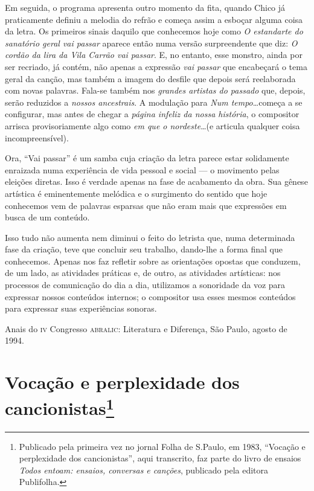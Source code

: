 Em seguida, o programa apresenta outro momento da fita, quando Chico já
praticamente definiu a melodia do refrão e começa assim a esboçar alguma
coisa da letra. Os primeiros sinais daquilo que conhecemos hoje como \textit{O
estandarte do sanatório geral vai passar} aparece então numa versão
surpreendente que diz: \textit{O cordão da lira da Vila Carrão vai passar}.
E, no entanto, esse monstro, ainda por ser recriado, já contém, não
apenas a expressão \textit{vai passar} que encabeçará o tema geral da canção,
mas também a imagem do desfile que depois será reelaborada com novas
palavras. Fala-se também nos \textit{grandes artistas do passado} que,
depois, serão reduzidos a \textit{nossos ancestrais}. A modulação para \textit{Num
tempo}\ldots começa a se configurar, mas antes de chegar a \textit{página
infeliz da nossa história}, o compositor arrisca provisoriamente algo
como \textit{em que o nordeste}\ldots (e articula qualquer coisa
incompreensível).

Ora, ``Vai passar'' é um samba cuja criação da letra parece estar
solidamente enraizada numa experiência de vida pessoal e social
 --- o movimento pelas eleições diretas. Isso é verdade apenas na fase de
acabamento da obra. Sua gênese artística é eminentemente melódica e o
surgimento do sentido que hoje conhecemos vem de palavras esparsas que
não eram mais que expressões em busca de um conteúdo.

Isso tudo não aumenta nem diminui o feito do letrista que, numa determinada fase da criação, teve que concluir seu trabalho, dando-lhe a
forma final que conhecemos. Apenas nos faz refletir sobre as orientações
opostas que conduzem, de um lado, as atividades práticas e, de outro, as
atividades artísticas: nos processos de comunicação do dia a dia,
utilizamos a sonoridade da voz para expressar nossos conteúdos internos;
o compositor usa esses mesmos conteúdos para expressar suas experiências
sonoras.

Anais do \textsc{iv} Congresso \textsc{abralic}: Literatura e Diferença, São Paulo, agosto
de 1994.

\chapter{Vocação e perplexidade dos cancionistas\footnote{Publicado pela primeira vez no jornal Folha de S.Paulo, em 1983, ``Vocação e perplexidade dos
cancionistas'', aqui transcrito, faz parte do livro de ensaios \textit{Todos entoam: ensaios, conversas e canções}, publicado pela editora Publifolha.}}



